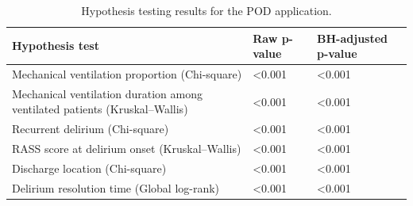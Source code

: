 \begin{table}[!h]
\centering
\caption{\label{tab:tab:pod_hypothesis_tests}Hypothesis testing results for the POD application.}
\centering
\begin{tabular}[t]{>{\raggedright\arraybackslash}p{9cm}>{\centering\arraybackslash}p{2.5cm}>{\centering\arraybackslash}p{3cm}}
\toprule
Hypothesis test & Raw p-value & BH-adjusted p-value\\
\midrule
Mechanical ventilation proportion (Chi-square) & <0.001 & <0.001\\
Mechanical ventilation duration among ventilated patients (Kruskal–Wallis) & <0.001 & <0.001\\
Recurrent delirium (Chi-square) & <0.001 & <0.001\\
RASS score at delirium onset (Kruskal–Wallis) & <0.001 & <0.001\\
Discharge location (Chi-square) & <0.001 & <0.001\\
Delirium resolution time (Global log-rank) & <0.001 & <0.001\\
\bottomrule
\end{tabular}
\end{table}
